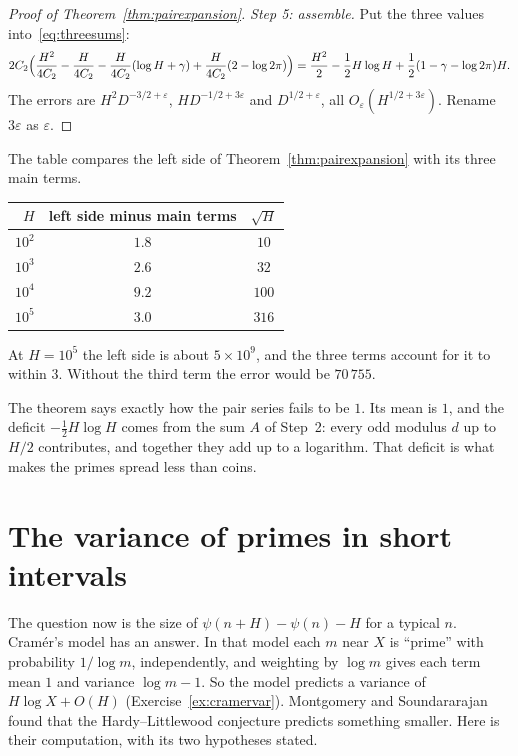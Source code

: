 \begin{proof}[Proof of Theorem~\ref{thm:pairexpansion}]
\emph{Step 5: assemble.} Put the three values into~\eqref{eq:threesums}:
\[
2C_2\Bigl(\frac{H^2}{4C_2}-\frac H{4C_2}-\frac H{4C_2}(\log H+\gamma)+\frac H{4C_2}(2-\log2\pi)\Bigr)=\frac{H^2}2-\frac12H\log H+\frac12(1-\gamma-\log2\pi)H.
\]
The errors are $H^2D^{-3/2+\varepsilon}$, $HD^{-1/2+3\varepsilon}$ and $D^{1/2+\varepsilon}$, all $O_\varepsilon(H^{1/2+3\varepsilon})$. Rename $3\varepsilon$ as $\varepsilon$.
\end{proof}

\begin{examplex}
The table compares the left side of Theorem~\ref{thm:pairexpansion} with its three main terms.
\begin{center}
\begin{tabular}{rcc}
$H$ & left side minus main terms & $\sqrt H$\\\hline
$10^2$ & $1.8$ & $10$\\
$10^3$ & $2.6$ & $32$\\
$10^4$ & $9.2$ & $100$\\
$10^5$ & $3.0$ & $316$
\end{tabular}
\end{center}
At $H=10^5$ the left side is about $5\times10^9$, and the three terms account for it to within $3$. Without the third term the error would be $70\,755$.
\end{examplex}

The theorem says exactly how the pair series fails to be $1$. Its mean is $1$, and the deficit $-\frac12H\log H$ comes from the sum $A$ of Step~2: every odd modulus $d$ up to $H/2$ contributes, and together they add up to a logarithm. That deficit is what makes the primes spread less than coins.

\section{The variance of primes in short intervals}

The question now is the size of $\psi(n+H)-\psi(n)-H$ for a typical $n$. Cram\'er's model has an answer. In that model each $m$ near $X$ is ``prime'' with probability $1/\log m$, independently, and weighting by $\log m$ gives each term mean $1$ and variance $\log m-1$. So the model predicts a variance of $H\log X+O(H)$ (Exercise~\ref{ex:cramervar}). Montgomery and Soundararajan found that the Hardy--Littlewood conjecture predicts something smaller. Here is their computation, with its two hypotheses stated.

